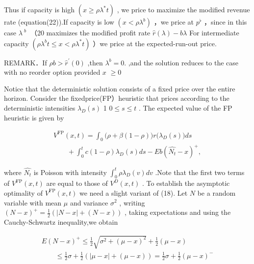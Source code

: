 Thus if capacity is high \(( x \ge \rho \lambda ^ { * } t )\) , we price
to maximize the modified revenue rate (equation(22)).If capacity is low
\(( x < \rho \lambda ^ { b } )\) ，we price at \(p ^ { \flat }\) ，since
in this case \(\lambda ^ { \textit { b } }\) （20 maximizes the modified
profit rate \({ \hat { r } } ( \lambda ) - b \lambda\) For intermediate
capacity \(( \rho \lambda ^ { b } t \le x < \rho \lambda ^ { * } t )\)
）we price at the expected-run-out price.

REMARK．If \(\rho b > \hat { r } ^ { \prime } ( 0 )\) ,then
\(\lambda ^ { b } = 0 .\) ,and the solution reduces to the case with no
reorder option provided \(x\) \(\geq 0\)

Notice that the deterministic solution consists of a fixed price over
the entire horizon. Consider the fixedprice(FP）heuristic that prices
according to the deterministic intensities \(\lambda _ { D } ( s )\) 1
\(0 \leq s \leq t\) . The expected value of the FP heuristic is given by

\[
\begin{array} { l } { { \displaystyle V ^ { \mathrm { F P } } ( x , t ) = \int _ { 0 } \big ( \rho + \beta ( 1 - \rho ) \big ) r \big ( \lambda _ { D } ( s ) \big ) d s } } \\ { { \displaystyle \qquad + \int _ { 0 } ^ { t } c ( 1 - \rho ) \lambda _ { D } ( s ) d s - E b ( \hat { N _ { t } } - x ) ^ { + } , } } \end{array}
\]

where \(\hat { N _ { t } }\) is Poisson with intensity
\(\int _ { 0 } ^ { t } \rho \lambda _ { D } ( v ) d v\) .Note that the
first two terms of \({ V } ^ { \mathrm { F P } } ( x , t )\) are equal
to those of \({ V ^ { D } } ( x , t )\) . To establish the asymptotic
optimality of \({ V } ^ { \mathrm { F P } } ( x , t )\) we need a slight
variant of (18). Let \(N\) be a random variable with mean \(\mu\) and
variance \(\sigma ^ { 2 }\) , writing
\(( N - x ) ^ { + } = { \textstyle \frac { 1 } { 2 } } ( | N - x | + ( N - x ) )\)
, taking expectations and using the Cauchy-Schwartz inequality,we obtain

\[
\begin{array} { l } { { \displaystyle E ( N - x ) ^ { + } \le \frac { 1 } { 2 } \sqrt { \sigma ^ { 2 } + ( \mu - x ) ^ { 2 } } + \frac { 1 } { 2 } ( \mu - x ) } } \\ { { \displaystyle \qquad \le \frac { 1 } { 2 } \sigma + \frac { 1 } { 2 } ( | \mu - x | + ( \mu - x ) ) = \frac { 1 } { 2 } \sigma + \frac { 1 } { 2 } ( \mu - x ) ^ { - } } } \end{array}
\]

